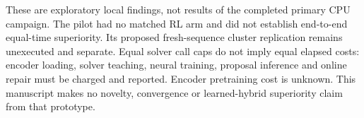 \documentclass{article}
\theoremstyle{plain}
\theoremstyle{definition}
\begin{document}
These are exploratory local findings, not results of the completed primary CPU campaign. The pilot had no matched RL arm and did not establish end-to-end equal-time superiority. Its proposed fresh-sequence cluster replication remains unexecuted and separate. Equal solver call caps do not imply equal elapsed costs: encoder loading, solver teaching, neural training, proposal inference and online repair must be charged and reported. Encoder pretraining cost is unknown. This manuscript makes no novelty, convergence or learned-hybrid superiority claim from that prototype.



\end{document}
